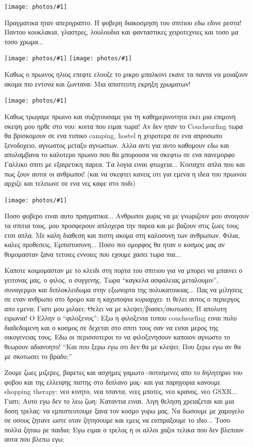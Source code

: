 \documentclass[11pt, letterpaper]{book}
\newcommand\photo[1]{\noindent\texttt{[image: photos/\#1]}}
\begin{document}
\photo{83.jpg}

Πραγματικα ηταν απεριγραπτο. H φοβερη διακοσμηση του σπιτιου εδω εδινε ρεστα!
Παντου κουκλακια, γλαστρες, λουλουδια και φανταστικες χειροτεχνιες και τοσο μα τοσο χρωμα...

\photo{84.jpg}
\photo{85.jpg}

Καθως ο πρωινος ηλιος επεφτε ελουζε το μικρο μπαλκονι εκανε τα παντα να μοιαζουν ακομα πιο εντονα και ζωντανα: Μια απιστευτη εκρηξη χρωματων!

\photo{86.jpg}

Καθως τρωγαμε πρωινο και συζητουσαμε για τη καθημερινοτητα εκει μια επιμονη σκεψη μου ηρθε στο νου: κοιτα που ειμαι τωρα! Αν δεν ηταν το Couchsurfing τωρα θα βρισκομουν σε ενα τυπικο camping, hostel η χειροτερα σε ενα απροσωπο ξενοδοχειο, αγνωστος μεταξυ αγνωστων.
Αλλα αντι για αυτο καθομουν εδω και απολαμβανα το καλυτερο πρωινο που θα μπορουσα να σκεφτω σε ενα πανεμορφο Γαλλικο σπιτι με εξαιρετικη παρεα.
Τα λογια ειναι φτωχεια... Κοιταχτε απλα που και πως ζουν αυτοι οι ανθρωποι! (και να σκεφτει κανεις οτι για εμενα η ιδεα του πρωινου αρχιζε και τελειωνε σε ενα νες καφε στο ποδι)

\photo{87.jpg}

Ποσο φοβερο ειναι αυτο πραγματικα... Ανθρωποι χωρις να με γνωριζουν μου ανοιγουν τα σπιτια τους, μου προσφερουν απλοχερα την παρεα και με βαζουν στις ζωες τους ετσι απλα. Με καλη διαθεση και πιστη ακομα στη καλοσυνη των ανθρωπων.
Φιλια, καλες προθεσεις, Εμπιστοσυνη... Ποσο πιο ομορφος θα ηταν ο κοσμος μας αν θυμομασταν ξανα τετοιες εννοιες που εχουμε χασει τωρα πια...

Καποτε κοιμομασταν με το κλειδι στη πορτα του σπιτιου για να μπορει να μπαινει ο γειτονας μας, ο φιλος, ο συγγενης. Τωρα ``καγκελα ασφαλειας μεταλουμιν'', συναγερμοι και διπλοκλειδωμα στην εξωπορτα της πολυκατοικιας...
Πας να μιλησεις σε εναν ανθρωπο στο δρομο και η καχυποψια κυριαρχει: τι θελει αυτος ο περιεργος απο εμενα; Γιατι μου μιλαει; Θελει να με κλεψει/βιασει/σκοτωσει;
Η απολυτη ειρωνια! Ο Ελλην ο ``φιλοξενος'': Εξω η φιλοξενια τυπου couchsurfing ειναι πολυ διαδεδομενη και ο κοσμος σε δεχεται στο σπιτι τους σαν να εισαι μερος της οικογενειας τους. Εδω οι περισσοτεροι το να φιλοξενησουν καποιον αγνωστο το θεωρουν αδιανοητο! ``Και που ξερω εγω οτι δεν θα με κλεψει; Που ξερω εγω αν θα με σκοτωσει το βραδυ;''

Ζουμε ζωες μιζερες, βαρετες και ασχημες γαμωτο -ποτισμενες απο το δηλητηριο του φοβου και της ελλειψης πιστης στο διπλανο μας- και για παρηγορια κανουμε shopping therapy: νεο κινητο, νεα τσαντα, νεες μποτες, νεο κρανος, νεο GSXR... Γιατι;
Αυτο εγω δεν το λεω ζωη: Καταντια ειναι. Λιγη θεληση χρειαζεται και μια δοση τρελας: να εμπιστευτουμε ξανα τον κοσμο γυρω μας. Να δωσουμε με χαμογελο σε οσους ζητανε ωστε οταν ζητησουμε και εμεις να εισπραξουμε το ιδιο... Τοσο πολλα ζηταω ρε παιδια; Εγω ειμαι ο τρελος η οι αλλοι χαζοι τελικα που δεν βλεπουν αυτα που βλεπω εγω;
\end{document}
